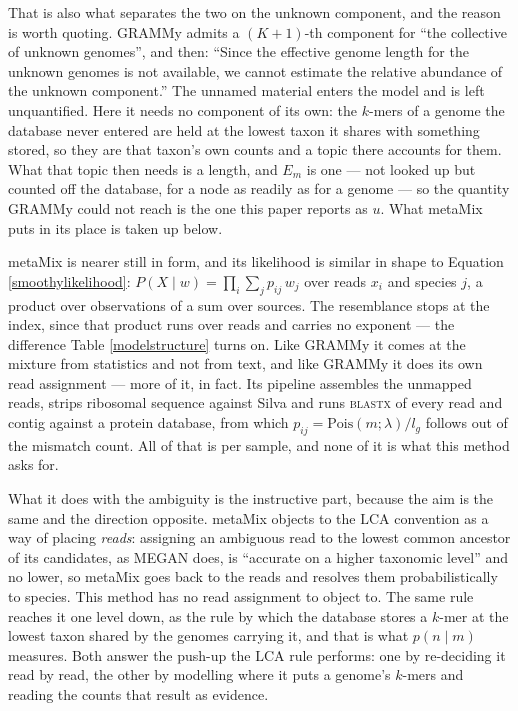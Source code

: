 \documentclass[pdflatex,sn-vancouver-num]{sn-jnl}
\begin{document}
    That is also what separates the two on the unknown component, and the reason is worth quoting.
    GRAMMy admits a $(K+1)$-th component for \enquote{the collective of unknown genomes}, and then:
    \enquote{Since the effective genome length for the unknown genomes is not available, we cannot
    estimate the relative abundance of the unknown component.} The unnamed material enters the model
    and is left unquantified. Here it needs no component of its own: the $k$-mers of a genome the
    database never entered are held at the lowest taxon it shares with something stored, so they are
    that taxon's own counts and a topic there accounts for them. What that topic then needs is a
    length, and $E_m$ is one --- not looked up but counted off the database, for a node as readily as
    for a genome --- so the quantity GRAMMy could not reach is the one this paper reports as $u$. What metaMix puts in its place is taken up below.

    metaMix \citep{metamix} is nearer still in form, and its likelihood is similar in shape to
    Equation \eqref{smoothylikelihood}: $P(X \mid w) = \prod_i \sum_j p_{ij}\, w_j$ over reads $x_i$ and
    species $j$, a product over observations of a sum over sources. The resemblance stops at the
    index, since that product runs over reads and carries no exponent --- the difference
    Table \ref{modelstructure} turns on. Like GRAMMy it comes at the
    mixture from statistics and not from text, and like GRAMMy it does its own read assignment ---
    more of it, in fact. Its pipeline assembles the unmapped reads, strips ribosomal sequence against
    Silva and runs \textsc{blastx} of every read and contig against a protein database, from which
    $p_{ij} = \mathrm{Pois}(m; \lambda)/l_g$ follows out of the mismatch count. All of that is per
    sample, and none of it is what this method asks for.

    What it does with the ambiguity is the instructive part, because the aim is the same and the
    direction opposite. metaMix objects to the $\mathrm{LCA}$ convention as a way of placing
    \emph{reads}: assigning an ambiguous read to the lowest common ancestor of its candidates, as
    MEGAN \citep{megan} does, is \enquote{accurate on a higher taxonomic level} and no lower, so metaMix goes back
    to the reads and resolves them probabilistically to species. This method has no read assignment
    to object to. The same rule reaches it one level down, as the rule by which the database stores a
    $k$-mer at the lowest taxon shared by the genomes carrying it, and that is what $p(n \mid m)$
    measures. Both answer the push-up the $\mathrm{LCA}$ rule performs: one by re-deciding it read by
    read, the other by modelling where it puts a genome's $k$-mers and reading the counts that
    result as evidence.
\end{document}
